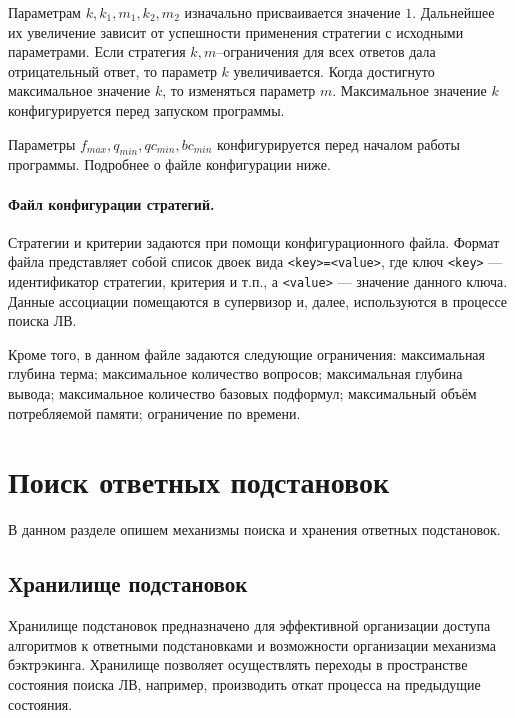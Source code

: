 Параметрам $k, k_1, m_1, k_2, m_2$ изначально присваивается значение $1$. Дальнейшее их увеличение зависит от успешности применения стратегии с исходными параметрами. Если стратегия $k,m$--ограничения для всех ответов дала отрицательный ответ, то параметр $k$ увеличивается. Когда достигнуто максимальное значение $k$, то изменяться параметр $m$. Максимальное значение $k$ конфигурируется перед запуском программы.

Параметры $f_{max}, q_{min}, qc_{min}, bc_{min}$ конфигурируется перед началом работы программы. Подробнее о файле конфигурации ниже.

\paragraph{Файл конфигурации стратегий.}
Стратегии и критерии задаются при помощи конфигурационного файла. Формат файла представляет собой список двоек вида \texttt{<key>=<value>}, где ключ \texttt{<key>} --- идентификатор стратегии, критерия и т.п., а \texttt{<value>} --- значение данного ключа. Данные ассоциации помещаются в супервизор и, далее, используются в процессе поиска ЛВ.

Кроме того, в данном файле задаются следующие ограничения: максимальная глубина терма; максимальное количество вопросов; максимальная глубина вывода; максимальное количество базовых подформул; максимальный объём потребляемой памяти; ограничение по времени.




\section{Поиск ответных подстановок}
В данном разделе опишем механизмы поиска и хранения ответных подстановок.


\subsection{Хранилище подстановок}
Хранилище подстановок предназначено для эффективной организации доступа алгоритмов к ответными подстановками и возможности организации механизма бэктрэкинга. Хранилище позволяет осуществлять переходы в пространстве состояния поиска ЛВ, например, производить откат процесса на предыдущие состояния.


